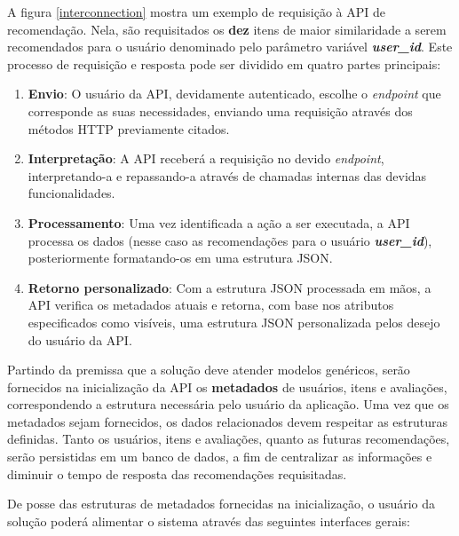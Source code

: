 \documentclass[12pt, openright, oneside, a4paper, brazil]{abntex2}
\begin{document}
A figura \ref{interconnection} mostra um exemplo de requisição à API de recomendação. Nela, são requisitados os \textbf{dez} itens de maior similaridade a serem recomendados para o usuário denominado pelo parâmetro variável \textbf{\textit{user\_id}}. Este processo de requisição e resposta pode ser dividido em quatro partes principais:

\begin{enumerate}

	\item \textbf{Envio}: O usuário da API, devidamente autenticado, escolhe o \textit{endpoint} que corresponde as suas necessidades, enviando uma requisição através dos métodos HTTP previamente citados.
	
	\item \textbf{Interpretação}: A API receberá a requisição no devido \textit{endpoint}, interpretando-a e repassando-a através de chamadas internas das devidas funcionalidades.
	
	\item \textbf{Processamento}: Uma vez identificada a ação a ser executada, a API processa os dados (nesse caso as recomendações para o usuário \textbf{\textit{user\_id}}), posteriormente formatando-os em uma estrutura JSON.

	\item \textbf{Retorno personalizado}: Com a estrutura JSON processada em mãos, a API verifica os metadados atuais e retorna, com base nos atributos especificados como visíveis, uma estrutura JSON personalizada pelos desejo do usuário da API.

\end{enumerate}

Partindo da premissa que a solução deve atender modelos genéricos, serão fornecidos na inicialização da API os \textbf{metadados} de usuários, itens e avaliações, correspondendo a estrutura necessária pelo usuário da aplicação. Uma vez que os metadados sejam fornecidos, os dados relacionados devem respeitar as estruturas definidas. Tanto os usuários, itens e avaliações, quanto as futuras recomendações, serão persistidas em um banco de dados, a fim de centralizar as informações e diminuir o tempo de resposta das recomendações requisitadas.

De posse das estruturas de metadados fornecidas na inicialização, o usuário da solução poderá alimentar o sistema através das seguintes interfaces gerais:
\end{document}
